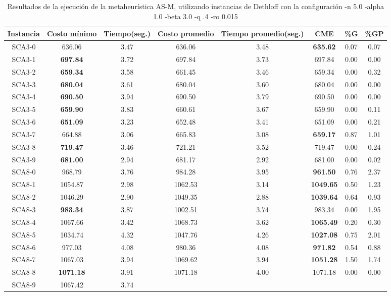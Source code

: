 \begin{table}[h]
\caption{Resultados de la ejecución de la metaheurística AS-M, utilizando instancias de Dethloff con la configuración -n 5.0 -alpha 1.0 -beta 3.0 -q .4 -ro 0.015}
\centering
\small
\begin{tabular}{c c c c c c c c}
\hline\hline
Instancia & Costo mínimo & Tiempo(seg.) & Costo promedio & Tiempo promedio(seg.) & CME & \%G & \%GP \\ [0.5ex]
\hline
SCA3-0 & 636.06 & 3.47 & 
636.06 & 3.48 & \bf{635.62} & 
0.07 & 0.07\\SCA3-1 & \bf{697.84} & 3.72 & 
697.84 & 3.73 & 697.84 & 0.00
 & 0.00\\
SCA3-2 & \bf{659.34} & 3.58 & 
661.45 & 3.46 & 659.34 & 0.00
 & 0.32\\SCA3-3 & \bf{680.04} & 3.61 & 
680.04 & 3.60 & 680.04 & 0.00
 & 0.00\\
SCA3-4 & \bf{690.50} & 3.94 & 
690.50 & 3.79 & 690.50 & 0.00
 & 0.00\\
SCA3-5 & \bf{659.90} & 3.83 & 
660.61 & 3.67 & 659.90 & 0.00
 & 0.11\\SCA3-6 & \bf{651.09} & 3.23 & 
652.48 & 3.41 & 651.09 & 0.00
 & 0.21\\SCA3-7 & 664.88 & 3.06 & 
665.83 & 3.08 & \bf{659.17} & 
0.87 & 1.01\\SCA3-8 & \bf{719.47} & 3.46 & 
721.21 & 3.52 & 719.47 & 0.00
 & 0.24\\SCA3-9 & \bf{681.00} & 2.94 & 
681.17 & 2.92 & 681.00 & 0.00
 & 0.02\\SCA8-0 & 968.79 & 3.76 & 
984.28 & 3.95 & \bf{961.50} & 
0.76 & 2.37\\SCA8-1 & 1054.87 & 2.98 & 
1062.53 & 3.14 & \bf{1049.65} & 
0.50 & 1.23\\SCA8-2 & 1046.29 & 2.90 & 
1049.35 & 2.88 & \bf{1039.64} & 
0.64 & 0.93\\SCA8-3 & \bf{983.34} & 3.87 & 
1002.51 & 3.74 & 983.34 & 0.00
 & 1.95\\SCA8-4 & 1067.66 & 3.42 & 
1068.73 & 3.62 & \bf{1065.49} & 
0.20 & 0.30\\SCA8-5 & 1034.74 & 4.32 & 
1047.76 & 4.26 & \bf{1027.08} & 
0.75 & 2.01\\SCA8-6 & 977.03 & 4.08 & 
980.36 & 4.08 & \bf{971.82} & 
0.54 & 0.88\\SCA8-7 & 1067.03 & 3.94 & 
1069.62 & 3.94 & \bf{1051.28} & 
1.50 & 1.74\\SCA8-8 & \bf{1071.18} & 3.91 & 
1071.18 & 4.00 & 1071.18 & 0.00
 & 0.00\\
SCA8-9 & 1067.42 & 3.74 & 

\end{tabular}
\end{table}

